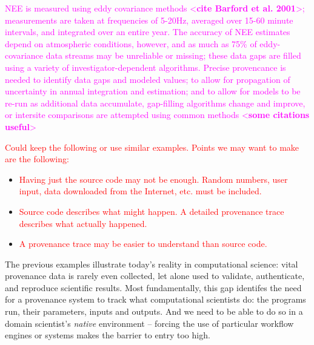 \documentclass[10pt]{article}
\newcommand{\todo}[1]{\textcolor{red}{#1}}
\begin{document}
\textcolor{magenta}{NEE is measured using eddy covariance methods 
<\textbf{cite Barford et al. 2001}>; measurements are taken at frequencies of
5-20Hz, averaged over 15-60 minute intervals, and integrated over an
entire year.  The accuracy of NEE estimates depend on atmospheric
conditions, however, and as much as 75\% of eddy-covariance data
streams may be unreliable or missing; these data gaps are filled using
a variety of investigator-dependent algorithms. Precise provencance is
needed to identify data gaps and modeled values; to allow for
propagation of uncertainty in annual integration and estimation; and
to allow for models to be re-run as additional data accumulate,
gap-filling algorithms change and improve, or intersite comparisons
are attempted using common methods <\textbf{some citations useful}>}



\todo{Could keep the following or use similar examples.  Points we may want 
to make are the following:}

\begin{itemize}
\item \todo{Having just the source code may not be enough.  Random numbers, user input, 
  data downloaded from the Internet, etc. must be included.}
\item \todo{Source code describes what might happen.  A detailed provenance trace describes
  what actually happened.}
\item \todo{A provenance trace may be easier to understand than source code.}
\end{itemize}

The previous examples illustrate today's reality in computational science:
vital provenance data is rarely even collected, let alone used to validate,
authenticate, and reproduce scientific results.
Most fundamentally, this gap identifes
the need for a provenance system to track what computational
scientists do: the programs run, their parameters, inputs and outputs.
And we need to be able to do so in a domain scientist's \emph{native}
environment -- forcing the use of particular workflow engines or systems
makes the barrier to entry too high.
\end{document}
